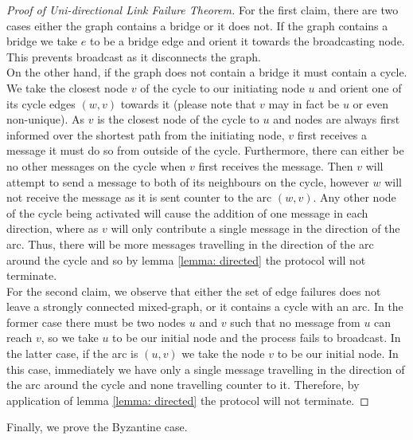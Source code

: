 \begin{proof}[Proof of Uni-directional Link Failure Theorem]
    For the first claim, there are two cases either the graph contains a bridge or it does not. 
    If the graph contains a bridge we take $e$ to be a bridge edge and orient it towards the broadcasting node. 
    This prevents broadcast as it disconnects the graph.\\
    On the other hand, if the graph does not contain a bridge it must contain a cycle. 
    We take the closest node $v$ of the cycle to our initiating node $u$ and orient one of its cycle edges $(w,v)$ towards it (please note that $v$ may in fact be $u$ or even non-unique).
    As $v$ is the closest node of the cycle to $u$ and nodes are always first informed over the shortest path from the initiating node, $v$ first receives a message it must do so from outside of the cycle.
    Furthermore, there can either be no other messages on the cycle when $v$ first receives the message.
    Then $v$ will attempt to send a message to both of its neighbours on the cycle, however $w$ will not receive the message as it is sent counter to the arc $(w,v)$.
    Any other node of the cycle being activated will cause the addition of one message in each direction, where as $v$ will only contribute a single message in the direction of the arc.
    Thus, there will be more messages travelling in the direction of the arc around the cycle and so by lemma \ref{lemma: directed} the protocol will not terminate.\\

    For the second claim, we observe that either the set of edge failures does not leave a strongly connected mixed-graph, or it contains a cycle with an arc. 
    In the former case there must be two nodes $u$ and $v$ such that no message from $u$ can reach $v$, so we take $u$ to be our initial node and the process fails to broadcast. 
    In the latter case, if the arc is $(u,v)$ we take the node $v$ to be our initial node. 
    In this case, immediately we have only a single message travelling in the direction of the arc around the cycle and none travelling counter to it. 
    Therefore, by application of lemma \ref{lemma: directed} the protocol will not terminate.
\end{proof}
Finally, we prove the Byzantine case.

